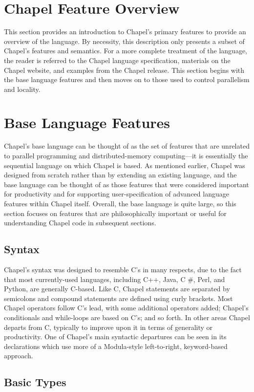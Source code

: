 \documentclass[letterpaper]{article}
\begin{document}
\section{Chapel Feature Overview}
This section provides an introduction to Chapel’s primary features to provide an overview of the language. By necessity, this description only presents a subset of Chapel’s features and semantics. For a more complete treatment of the language, the reader is referred to the Chapel language specification, materials on the Chapel website, and examples from the Chapel release. This section begins with the base language features and then moves on to those used to control parallelism and locality.

\section{Base Language Features}
Chapel’s base language can be thought of as the set of features that are unrelated to parallel programming and distributed-memory computing—it is essentially the sequential language on which Chapel is based. As mentioned earlier, Chapel was designed from scratch rather than by extending an existing language, and the base language can be thought of as those features that were considered important for productivity and for supporting user-specification of advanced language features within Chapel itself. Overall, the base language is quite large, so this section focuses on features that are philosophically important or useful for understanding Chapel code in subsequent sections.

\subsection{Syntax}
Chapel’s syntax was designed to resemble C’s in many respects, due to the fact that most currently-used
languages, including C++, Java, C \#, Perl, and Python, are generally C-based. Like C, Chapel statements are separated by semicolons and compound statements are defined using curly brackets. Most Chapel operators follow C’s lead, with some additional operators added; Chapel’s conditionals and while-loops are based on C’s; and so forth. In other areas Chapel departs from C, typically to improve upon it in terms of generality or productivity. One of Chapel’s main syntactic departures can be seen in its declarations which use more of a Modula-style left-to-right, keyword-based approach.

\subsection{Basic Types}
\end{document}

